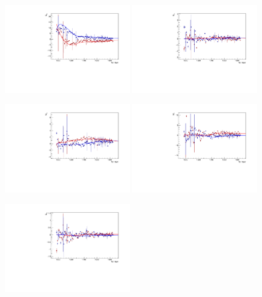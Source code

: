 \documentclass[a4paper,12pt]{report}
\begin{document}
\begin{figure}
  \begin{center}
    \centerline{
    \includegraphics[width=0.49\textwidth]{MAID2015a/free/plots.0/E0p.pdf}
    \includegraphics[width=0.49\textwidth]{MAID2015a/free/plots.0/E1p.pdf}
    }
    \centerline{
    \includegraphics[width=0.49\textwidth]{MAID2015a/free/plots.0/M1p.pdf}
    \includegraphics[width=0.49\textwidth]{MAID2015a/free/plots.0/M1m.pdf}
    }
    \centerline{
    \includegraphics[width=0.49\textwidth]{MAID2015a/free/plots.0/E2p.pdf}
}
\end{center}
\end{figure}
\end{document}
